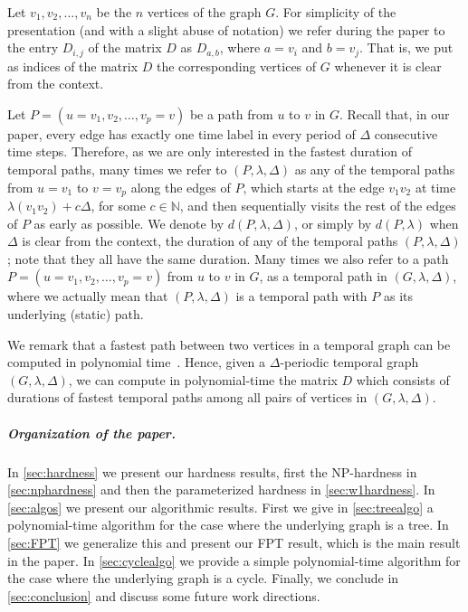 \documentclass[a4paper,UKenglish,cleveref, autoref, thm-restate, anonymous]{lipics-v2021}
\begin{document}
Let $v_1,v_2,\ldots,v_n$ be the $n$ vertices of the graph $G$. 
For simplicity of the presentation (and with a slight abuse of notation) we refer during the paper to the entry $D_{i,j}$ of the matrix $D$ as $D_{a,b}$, where $a=v_i$ and $b=v_j$. 
That is, we put as indices of the matrix $D$ the corresponding vertices of $G$ whenever it is clear from the context. 

Let $P=(u=v_1, v_2, \dots, v_p=v)$ be a path from $u$ to $v$ in $G$. 
Recall that, in our paper, every edge has exactly one time label in every period of $\Delta$ consecutive time steps. 
Therefore, as we are only interested in the fastest duration of temporal paths, 
many times we refer to $(P,\lambda,\Delta)$ as any of the temporal paths from $u=v_1$ to $v=v_p$ along the edges of $P$, which starts at the edge $v_1 v_2$ at time $\lambda(v_1 v_2) + c \Delta$, for some $c\in \mathbb{N}$, and then sequentially visits the rest of the edges of $P$ as early as possible. 
We denote by $d(P,\lambda,\Delta)$, or simply by $d(P,\lambda)$ when $\Delta$ is clear from the context, the duration of any of the temporal paths $(P,\lambda,\Delta)$; note that they all have the same duration. 
Many times we also refer to a path $P=(u=v_1, v_2, \dots, v_p=v)$ from $u$ to $v$ in $G$,
as a temporal path in $(G,\lambda,\Delta)$,
where we actually mean that $(P,\lambda,\Delta)$ is a temporal path with $P$ as its underlying (static) path.


We remark that a fastest path between two vertices in a temporal graph can be computed in polynomial time~\cite{xuan_computing_2003,Wu2016Efficient}.
Hence, given a $\Delta$-periodic temporal graph $(G,\lambda,\Delta)$, we can compute in polynomial-time  the matrix $D$
which consists of durations of fastest temporal paths among all pairs of vertices in $(G,\lambda,\Delta)$.


\subparagraph{Organization of the paper.}
In \cref{sec:hardness} we present our hardness results, first the NP-hardness in \cref{sec:nphardness} and then the parameterized hardness in \cref{sec:w1hardness}. In \cref{sec:algos} we present our algorithmic results. First we give in \cref{sec:treealgo} a polynomial-time algorithm for the case where the underlying graph is a tree. In \cref{sec:FPT} we generalize this and present our FPT result, which is the main result in the paper. In \cref{sec:cyclealgo} we provide a simple polynomial-time algorithm for the case where the underlying graph is a cycle. Finally, we conclude in \cref{sec:conclusion} and discuss some future work directions.
\end{document}
